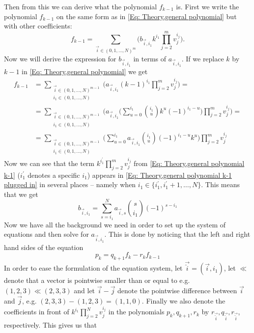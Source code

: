 Then from this we can derive what the polynomial $f_{k-1}$ is. First we write the polynomial $f_{k-1}$ on the same form as in \ref{Eq: Theory,general polynomial} but with other coefficients:
\begin{equation}\label{Eq: Theory,general polynomial k-1}
  f_{k-1} = \sum_{\vec{i}\in (0,1,\ldots,N)^m} \Big(b_{\vec{i},i_1}k^{i_1}\prod_{j=2}^m v_j^{i_j}\Big).
\end{equation}
Now we will derive the expression for $b_{\vec{i},i_1}$ in terms of $a_{\vec{i},i_1}$. If we replace $k$ by $k-1$ in \ref{Eq: Theory,general polynomial} we get
\begin{equation}\label{Eq: Theory,general polynomial k-1 plugged in}
  \begin{split}
    f_{k-1} & = \sum_{\substack{\vec{i}\in (0,1,\ldots,N)^{m-1}\\i_1\in (0,1,\ldots,N)}} \Big(a_{\vec{i},i_1}(k-1)^{i_1}\prod_{j=2}^m v_j^{i_j}\Big) = \\
    & = \sum_{\substack{\vec{i}\in (0,1,\ldots,N)^{m-1}\\i_1\in (0,1,\ldots,N)}} \Big(a_{\vec{i},i_1}\Bigg(\sum_{u=0}^{i_1} \binom{i_1}{u}k^u (-1)^{i_1-u}\Bigg)\prod_{j=2}^m v_j^{i_j}\Big) = \\
    & = \sum_{\substack{\vec{i}\in (0,1,\ldots,N)^{m-1}\\i_1\in (0,1,\ldots,N)}} \Bigg(\sum_{u=0}^{i_1} a_{\vec{i},i_1}\binom{i_1}{u}(-1)^{i_1-u}k^u\Bigg) \prod_{j=2}^m v_j^{i_j}
  \end{split}
\end{equation}
Now we can see that the term $k^{i_1^\prime}\prod_{j=2}^m v_j^{i_j}$ from \ref{Eq: Theory,general polynomial k-1} ($i_1^\prime$ denotes a specific $i_1$) appears in \ref{Eq: Theory,general polynomial k-1 plugged in} in several places -- namely when $i_1\in\{i_1^\prime,i_1^\prime+1,\ldots,N\}$. This means that we get
\begin{equation}\label{Eq: Theory,fk-1 coefficients}
  b_{\vec{i},i_1} = \sum_{s=i_1}^N a_{\vec{i},s}\binom{s}{i_1}(-1)^{s-i_1}
\end{equation}
Now we have all the background we need in order to set up the system of equations and then solve for $a_{\vec{i},i_1}$. This is done by noticing that the left and right hand sides of the equation
\begin{equation}\label{Eq: Theory,f equation}
  p_k=q_{k+1}f_k - r_k f_{k-1}
\end{equation}
In order to ease the formulation of the equation system, let $\vec{\hat{i}}=(\vec{i},i_1)$, let $\ll$ denote that a vector is pointwise smaller than or equal to e.g. $(1,2,3)\ll(2,3,3)$ and let $\vec{i}-\vec{j}$ denote the pointwise difference between $\vec{i}$ and $\vec{j}$, e.g. $(2,3,3)-(1,2,3)=(1,1,0)$. Finally we also denote the coefficients in front of $k^{i_1}\prod_{j=2}^N v_j^{i_j}$ in the polynomials $p_k, q_{k+1}, r_k$ by $r_\vec{\hat{i}}, q_\vec{\hat{i}}, r_\vec{\hat{i}}$, respectively. This gives us that
